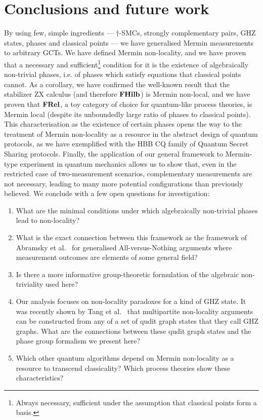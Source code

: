 
\section{Conclusions and future work}
        \label{section_conclusion}
        By using few, simple ingredients --- $\dagger$-SMCs, strongly complementary pairs, GHZ states, phases and classical points --- we have generalised Mermin measurements to arbitrary GCTs. 
        We have defined Mermin non-locality, and we have proven that a necessary and sufficient\footnote{Always necessary, sufficient under the assumption that classical points form a basis.} condition for it is the existence of algebraically non-trivial phases, i.e. of phases which satisfy equations that classical points cannot. 
        As a corollary, we have confirmed the well-known result that the stabilizer ZX calculus (and therefore $\mathbf{FHilb}$) is Mermin non-local, and we have proven that $\mathbf{FRel}$, a toy category of choice for quantum-like process theories, is Mermin local (despite its unboundedly large ratio of phases to classical points). 
        This characterisation as the existence of certain phases opens the way to the treatment of Mermin non-locality as a resource in the abstract design of quantum protocols, as we have exemplified with the HBB CQ family of Quantum Secret Sharing protocols. 
        Finally, the application of our general framework to Mermin-type experiment in quantum mechanics allows us to show that, even in the restricted case of two-measurement scenarios, complementary measurements are not necessary, leading to many more potential configurations than previously believed.
        We conclude with a few open questions for investigation:
        \begin{enumerate}
        \item What are the minimal conditions under which algebraically non-trivial phases lead to non-locality?
        \item What is the exact connection between this framework as the framework of Abramsky et al.~\cite{NLC-AvN} for generalised All-versus-Nothing arguments where measurement outcomes are elements of some general field?
        \item Is there a more informative group-theoretic formulation of the algebraic non-triviality used here?
        \item Our analysis focuses on non-locality paradoxes for a kind of GHZ state.  It was recently shown by Tang et al.~\cite{tang2013greenberger} that multipartite non-locality arguments can be constructed from any of a set of qudit graph states that they call GHZ graphs.  What are the connections between these qudit graph states and the phase group formalism we present here?
        \item Which other quantum algorithms depend on Mermin non-locality as a resource to transcend classicality? Which process theories show these characteristics?
        \end{enumerate}

